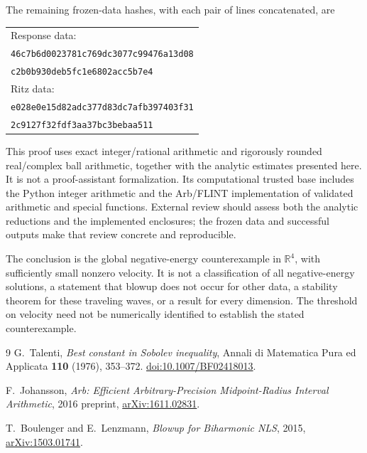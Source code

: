 \documentclass[11pt,a4paper]{article}
\theoremstyle{definition}\newtheorem{definition}[theorem]{Definition}
\theoremstyle{remark}\newtheorem{remark}[theorem]{Remark}
\newcommand{\R}{\mathbb R}
\begin{document}
The remaining frozen-data hashes, with each pair of lines concatenated, are
\begin{center}\small
\begin{tabular}{@{}l@{}}
Response data:\\[-1pt]
\texttt{46c7b6d0023781c769dc3077c99476a13d08}\\
\texttt{c2b0b930deb5fc1e6802acc5b7e4}\\[4pt]
Ritz data:\\[-1pt]
\texttt{e028e0e15d82adc377d83dc7afb397403f31}\\
\texttt{2c9127f32fdf3aa37bc3bebaa511}
\end{tabular}
\end{center}

This proof uses exact integer/rational arithmetic and rigorously rounded real/complex ball arithmetic, together with the analytic estimates presented here. It is not a proof-assistant formalization. Its computational trusted base includes the Python integer arithmetic and the Arb/FLINT implementation of validated arithmetic and special functions. External review should assess both the analytic reductions and the implemented enclosures; the frozen data and successful outputs make that review concrete and reproducible.

The conclusion is the global negative-energy counterexample in \(\R^4\), with sufficiently small nonzero velocity. It is not a classification of all negative-energy solutions, a statement that blowup does not occur for other data, a stability theorem for these traveling waves, or a result for every dimension. The threshold on velocity need not be numerically identified to establish the stated counterexample.

\begin{thebibliography}{9}
G.~Talenti, \emph{Best constant in Sobolev inequality},
Annali di Matematica Pura ed Applicata \textbf{110} (1976), 353--372.
\href{https://doi.org/10.1007/BF02418013}{doi:10.1007/BF02418013}.

F.~Johansson, \emph{Arb: Efficient Arbitrary-Precision Midpoint-Radius Interval Arithmetic},
2016 preprint, \href{https://arxiv.org/abs/1611.02831}{arXiv:1611.02831}.

T.~Boulenger and E.~Lenzmann, \emph{Blowup for Biharmonic NLS},
2015, \href{https://arxiv.org/abs/1503.01741}{arXiv:1503.01741}.
\end{thebibliography}
\end{document}
